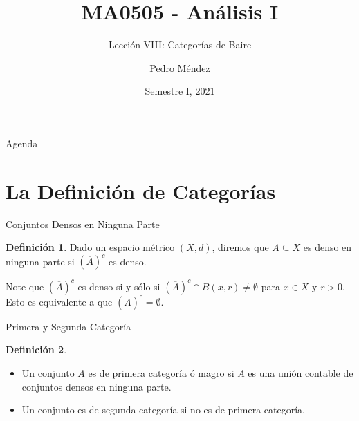 \documentclass[utf8]{beamer}
\title[MA0505]{MA0505 - An\'alisis I}
\subtitle{Lecci\'on VIII: Categorías de Baire}
\author{Pedro M\'endez\inst{1}}
\institute[Universidad de Costa Rica] %
{
  \inst{1}%
  Departmento de Matem\'atica Pura y Ciencias Actuariales\\
  Universidad de Costa Rica
  }
\date[I-2021] {Semestre I, 2021}
\theoremstyle{plain}
\theoremstyle{definition}
\newtheorem{Def}{Definición}           %
\theoremstyle{remark}
\numberwithin{equation}{section}
\newcommand{\ov}{\overline}
\begin{document}
\begin{frame}
  \titlepage
\end{frame}

\begin{frame}{Agenda}
  \tableofcontents
\end{frame}





\section{La Definición de Categorías}

\begin{frame}{Conjuntos Densos en Ninguna Parte}
  \begin{Def}\label{def:nowhereDense}
    Dado un espacio métrico $(X,d)$, diremos que $A\subseteq X$ es \alert{denso en ninguna parte} si $(\ov A)^c$ es denso.
  \end{Def}
 Note que $(\ov A)^c$ es denso si y sólo si $(\ov A)^c\cap B(x,r)\neq \emptyset$ para $x\in X$ y $r>0$. Esto es equivalente a que $(\ov A)^\circ=\emptyset$.
\end{frame}

\begin{frame}{Primera y Segunda Categoría}
  \begin{Def}\label{def:cat1}
    \begin{itemize}
      \item Un conjunto $A$ es de \alert{primera categoría} ó \alert{magro} si $A$ es una unión contable de conjuntos densos en ninguna parte.
      \item Un conjunto es de \alert{segunda categoría} si no es de primera categoría.
    \end{itemize}
    
  \end{Def}
\end{frame}
\end{document}
